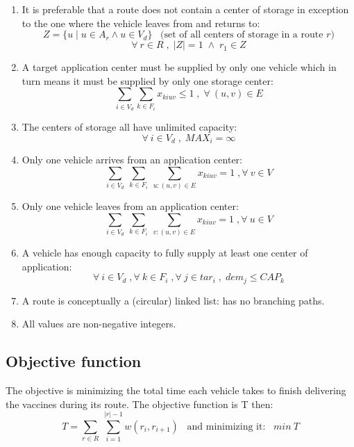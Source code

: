 \documentclass{article}
\begin{document}
\begin{description}
\begin{enumerate}
     \item It is preferable that a route does not contain a center of storage in exception to the one where the vehicle leaves from and returns to:\\
     \[Z=\{u\;|\; u \in A_r \wedge u \in V_d\} \;\;\;\text{(set of all centers of storage in a route $r$)}\]
         \[ \forall\:r \in R \;,\; |Z| = 1\;\wedge\; r_1 \in Z \]

    \item A target application center must be supplied by only one vehicle which in turn means it must be supplied by only one storage center:
        \[ \sum_{i \in V_d^{}}\sum_{k \in F_i^{}} x_{kiuv} \leq 1\;,\;\forall\:(u,v) \in E\]
        
    \item The centers of storage all have unlimited capacity:
        \[ \forall\:i \in V_d \;,\; MAX_i = \infty \]
        
    \item Only one vehicle arrives from an application center:
        \[ \sum_{i\in V_d^{}}\: \sum_{k \in F_i^{}}\: \sum_{u:(u,v)\in E^{}} x_{kiuv}=1\;,\forall\:v\in V \]
        
    \item Only one vehicle leaves from an application center:
        \[ \sum_{i\in V_d^{}}\: \sum_{k \in F_i^{}}\: \sum_{v:(u,v)\in E^{}} x_{kiuv}=1\;,\forall\:u\in V\]  
        
    \item A vehicle has enough capacity to fully supply at least one center of application:
       \[ \forall\:i \in V_d \;,\forall\:k \in F_i\;,\forall\:j \in tar_i\;,\; dem_j \leq CAP_k \]

    \item A route is conceptually a (circular) linked list: has no branching paths.
    \item All values are non-negative integers.
\end{enumerate}
\end{description}
\subsection{Objective function}
The objective is minimizing the total time each vehicle takes to finish delivering the vaccines during its route. The objective function is T then:
    \[  T = \sum_{r\in R}^{}\:\sum_{i=1}^{|r|-1} w(r_i, r_{i+1})\;\;\; \text{and minimizing it:}\;\;\; min\:T\]

\newpage
\end{document}
